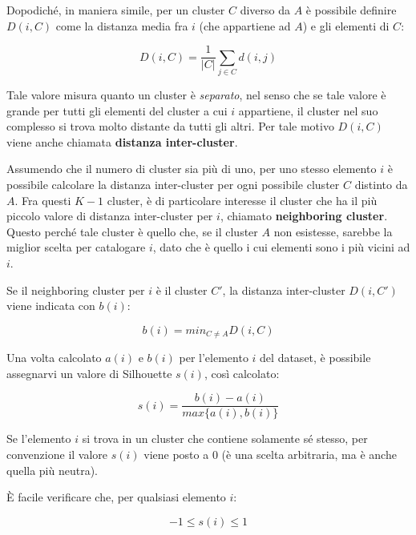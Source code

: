 \documentclass[12pt]{report}
\begin{document}
			Dopodiché, in maniera simile, per un cluster $C$ diverso da $A$
			è possibile definire $D(i, C)$ come la distanza media fra $i$
			(che appartiene ad $A$) e gli elementi di $C$:

			\begin{equation*}
				D(i, C) = \frac{1}{|C|} \sum_{j \in C} d(i, j)
			\end{equation*}

			Tale valore misura quanto un cluster è \textit{separato}, nel senso
			che se tale valore è grande per tutti gli elementi del cluster a cui
			$i$ appartiene, il cluster nel suo complesso si trova molto distante
			da tutti gli altri. Per tale motivo $D(i, C)$ viene anche chiamata
			\textbf{distanza inter-cluster}.

			Assumendo che il numero di cluster sia più di uno, per uno stesso elemento
			$i$ è possibile calcolare la distanza inter-cluster per ogni possibile
			cluster $C$ distinto da $A$. Fra questi $K - 1$ cluster, è di particolare
			interesse il cluster che ha il più piccolo valore di distanza inter-cluster
			per $i$, chiamato \textbf{neighboring cluster}. Questo perché tale cluster
			è quello che, se il cluster $A$ non esistesse, sarebbe la miglior scelta
			per catalogare $i$, dato che è quello i cui elementi sono i più vicini ad
			$i$.

			Se il neighboring cluster per $i$ è il cluster $C'$, la distanza
			inter-cluster $D(i, C')$ viene indicata con $b(i)$:

			\begin{equation}
				b(i) = min_{C \neq A} D(i, C)
			\end{equation}

			Una volta calcolato $a(i)$ e $b(i)$ per l'elemento $i$ del dataset, è
			possibile assegnarvi un valore di Silhouette $s(i)$, così calcolato:

			\begin{equation}
				s(i) = \frac{b(i) - a(i)}{max\{a(i), b(i)\}}
			\end{equation}

			Se l'elemento $i$ si trova in un cluster che contiene solamente sé stesso,
			per convenzione il valore $s(i)$ viene posto a $0$ (è una scelta arbitraria,
			ma è anche quella più neutra).

			È facile verificare che, per qualsiasi elemento $i$:

			\begin{equation*}
				-1 \leq s(i) \leq 1
			\end{equation*}
\end{document}
